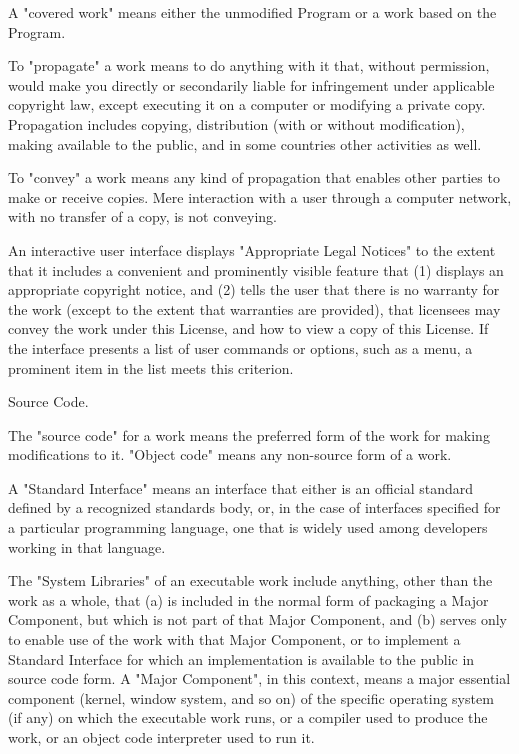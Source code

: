 A "{}covered work"{} means either the unmodified Program or a work based on the Program.

To "{}propagate"{} a work means to do anything with it that, without permission, would make you directly or secondarily liable for infringement under applicable copyright law, except executing it on a computer or modifying a private copy. Propagation includes copying, distribution (with or without modification), making available to the public, and in some countries other activities as well.

To "{}convey"{} a work means any kind of propagation that enables other parties to make or receive copies. Mere interaction with a user through a computer network, with no transfer of a copy, is not conveying.

An interactive user interface displays "{}\+Appropriate Legal Notices"{} to the extent that it includes a convenient and prominently visible feature that (1) displays an appropriate copyright notice, and (2) tells the user that there is no warranty for the work (except to the extent that warranties are provided), that licensees may convey the work under this License, and how to view a copy of this License. If the interface presents a list of user commands or options, such as a menu, a prominent item in the list meets this criterion.


\begin{DoxyEnumerate}
\item Source Code.
\end{DoxyEnumerate}

The "{}source code"{} for a work means the preferred form of the work for making modifications to it. "{}\+Object code"{} means any non-\/source form of a work.

A "{}\+Standard Interface"{} means an interface that either is an official standard defined by a recognized standards body, or, in the case of interfaces specified for a particular programming language, one that is widely used among developers working in that language.

The "{}\+System Libraries"{} of an executable work include anything, other than the work as a whole, that (a) is included in the normal form of packaging a Major Component, but which is not part of that Major Component, and (b) serves only to enable use of the work with that Major Component, or to implement a Standard Interface for which an implementation is available to the public in source code form. A "{}\+Major Component"{}, in this context, means a major essential component (kernel, window system, and so on) of the specific operating system (if any) on which the executable work runs, or a compiler used to produce the work, or an object code interpreter used to run it.

